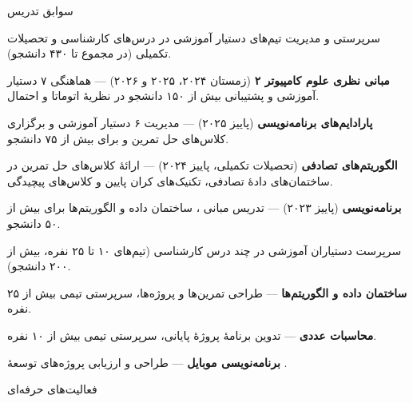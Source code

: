 \documentclass[11pt]{article}
\begin{document}
\begin{faSection}{سوابق تدریس}

سرپرستی و مدیریت تیم‌های دستیار آموزشی در درس‌های کارشناسی و تحصیلات تکمیلی (در مجموع تا ۴۳۰ دانشجو).
\begin{faItems}
  \item \textbf{مبانی نظری علوم کامپیوتر ۲} (زمستان ۲۰۲۴، ۲۰۲۵ و ۲۰۲۶) --- هماهنگی ۷ دستیار آموزشی و پشتیبانی بیش از ۱۵۰ دانشجو در نظریۀ اتوماتا و احتمال.
  \item \textbf{پارادایم‌های برنامه‌نویسی} (پاییز ۲۰۲۵) --- مدیریت ۶ دستیار آموزشی و برگزاری کلاس‌های حل تمرین  و  برای بیش از ۷۵ دانشجو.
  \item \textbf{الگوریتم‌های تصادفی} (تحصیلات تکمیلی، پاییز ۲۰۲۴) --- ارائۀ کلاس‌های حل تمرین در ساختمان‌های دادۀ تصادفی، تکنیک‌های کران پایین و کلاس‌های پیچیدگی.
  \item \textbf{برنامه‌نویسی } (پاییز ۲۰۲۳) --- تدریس مبانی ، ساختمان داده و الگوریتم‌ها برای بیش از ۵۰ دانشجو.
\end{faItems}

سرپرست دستیاران آموزشی در چند درس کارشناسی (تیم‌های ۱۰ تا ۲۵ نفره، بیش از ۲۰۰ دانشجو).
\begin{faItems}
  \item \textbf{ساختمان داده و الگوریتم‌ها} --- طراحی تمرین‌ها و پروژه‌ها، سرپرستی تیمی بیش از ۲۵ نفره.
  \item \textbf{محاسبات عددی} --- تدوین برنامۀ پروژۀ پایانی، سرپرستی تیمی بیش از ۱۰ نفره.
  \item \textbf{برنامه‌نویسی موبایل} --- طراحی و ارزیابی پروژه‌های توسعۀ .
\end{faItems}

\end{faSection}

\begin{faSection}{فعالیت‌های حرفه‌ای}
\end{faSection}
\end{document}
